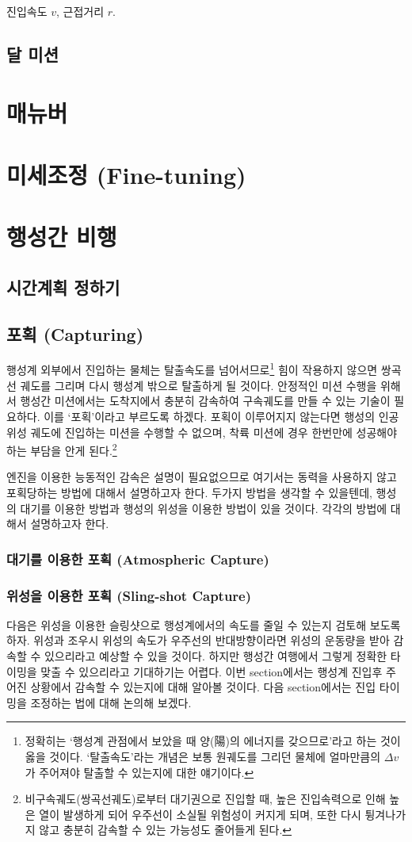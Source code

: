 \documentclass[9pt]{amsbook}
\begin{document}
진입속도 $v$, 근접거리 $r$.

\chapter{달 미션}

\part{매뉴버}
\part{미세조정 (Fine-tuning)}
\part{행성간 비행}
\chapter{시간계획 정하기}
\chapter{포획 (Capturing)}
행성계 외부에서 진입하는 물체는 탈출속도를 넘어서므로\footnote{정확히는 `행성계 관점에서 보았을 때 양(陽)의 에너지를 갖으므로'라고 하는 것이 옳을 것이다. `탈출속도'라는 개념은 보통 원궤도를 그리던 물체에 얼마만큼의 $\Delta v$가 주어져야 탈출할 수 있는지에 대한 얘기이다.} 힘이 작용하지 않으면 쌍곡선 궤도를 그리며 다시 행성계 밖으로 탈출하게 될 것이다.
안정적인 미션 수행을 위해서 행성간 미션에서는 도착지에서 충분히 감속하여 구속궤도를 만들 수 있는 기술이 필요하다. 이를 `포획'이라고 부르도록 하겠다. 포획이 이루어지지 않는다면 행성의 인공위성 궤도에 진입하는 미션을 수행할 수 없으며, 착륙 미션에 경우 한번만에 성공해야 하는 부담을 안게 된다.\footnote{비구속궤도(쌍곡선궤도)로부터 대기권으로 진입할 때, 높은 진입속력으로 인해 높은 열이 발생하게 되어 우주선이 소실될 위험성이 커지게 되며, 또한 다시 튕겨나가지 않고 충분히 감속할 수 있는 가능성도 줄어들게 된다.}

엔진을 이용한 능동적인 감속은 설명이 필요없으므로 여기서는 동력을 사용하지 않고 포획당하는 방법에 대해서 설명하고자 한다. 두가지 방법을 생각할 수 있을텐데, 행성의 대기를 이용한 방법과 행성의 위성을 이용한 방법이 있을 것이다. 각각의 방법에 대해서 설명하고자 한다.
\section{대기를 이용한 포획 (Atmospheric Capture)}
\section{위성을 이용한 포획 (Sling-shot Capture)}
다음은 위성을 이용한 슬링샷으로 행성계에서의 속도를 줄일 수 있는지 검토해 보도록 하자. 위성과 조우시 위성의 속도가 우주선의 반대방향이라면 위성의 운동량을 받아 감속할 수 있으리라고 예상할 수 있을 것이다. 하지만 행성간 여행에서 그렇게 정확한 타이밍을 맞출 수 있으리라고 기대하기는 어렵다. 이번 section에서는 행성계 진입후 주어진 상황에서 감속할 수 있는지에 대해 알아볼 것이다. 다음 section에서는 진입 타이밍을 조정하는 법에 대해 논의해 보겠다.
\end{document}

